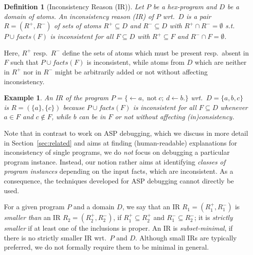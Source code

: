 \documentclass[11pt,fleqn,twoside]{article}
\def\naf{\ensuremath{\mathop{not}}}
\newcommand\hex{{\sc hex}\xspace}
\newcommand{\Program}{\ensuremath{P}}
\newcommand{\toFacts}[1]{\mathit{facts}(#1)}
\newtheorem{definition}{Definition}
\newtheorem{example}{Example}
\begin{document}
			\begin{definition}[Inconsistency Reason (IR)]
				\label{def:inconsistencyReason}
				Let $P$ be a \hex-program and $D$ be a domain of atoms.
				An \emph{inconsistency reason (IR)} of $P$ wrt.~$D$
				is a pair $R = (R^{+}, R^{-})$ of sets of atoms $R^{+} \subseteq D$ and $R^{-} \subseteq D$ with $R^{+} \cap R^{-} = \emptyset$
				s.t.~$P \cup \toFacts{F}$ is inconsistent for all $F \subseteq D$ with $R^{+} \subseteq F$ and $R^{-} \cap F = \emptyset$.
			\end{definition}

			Here, $R^{+}$ resp.~$R^{-}$ define the sets of atoms which must be present resp.~absent in $F$ such that
			$P \cup \toFacts{F}$ is inconsistent, while atoms from $D$ which are neither in $R^{+}$ nor in $R^{-}$ might be arbitrarily added or not without affecting inconsistency.

			\begin{example}
				An IR of the program $P = \{ \leftarrow a, \naf c; \ d \leftarrow b. \}$ %
				wrt.~$D = \{ a, b, c \}$ is $R = (\{ a \}, \{ c \})$
				because $P \cup \toFacts{F}$ is inconsistent for all $F \subseteq D$ whenever $a \in F$ and $c \not\in F$,
				while $b$ can be in $F$ or not without affecting (in)consistency.
			\end{example}

			Note that in contrast to work on ASP debugging, which we discuss in more detail in Section~\ref{sec:related} and aims at finding (human-readable) explanations for inconsistency of
			single programs, we do \emph{not} focus on debugging a particular program instance.
			Instead, our notion rather aims at identifying \emph{classes of program instances} depending on the input facts, which are inconsistent.
			As a consequence, the techniques developed for ASP debugging cannot directly be used. %

			For a given program $\Program$ and a domain $D$,
			we say that an IR $R_1 = (R_1^{+}, R_1^{-})$ is \emph{smaller than} an IR $R_2 = (R_2^{+}, R_2^{-})$,
			if $R_1^{+} \subseteq R_2^{+}$ and $R_1^{-} \subseteq R_2^{-}$; it is \emph{strictly smaller} if at least one of the inclusions is proper.
			An IR is \emph{subset-minimal}, if there is no strictly smaller IR wrt.~$\Program$ and $D$.			
			Although small IRs are typically preferred, we do not formally require them to be minimal in general.
\end{document}
